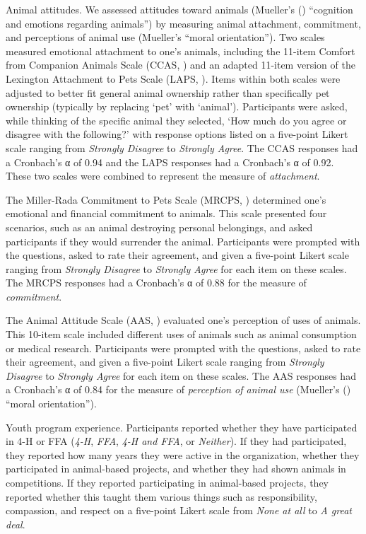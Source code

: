 \documentclass[
  jou,
  longtable,
  nolmodern,
  notxfonts,
  notimes,
  colorlinks=true,linkcolor=blue,citecolor=blue,urlcolor=blue]{apa7}
\begin{document}
{Animal attitudes.} We assessed attitudes toward animals (Mueller's
() ``cognition and emotions regarding
animals'') by measuring animal attachment, commitment, and perceptions
of animal use (Mueller's ``moral orientation''). Two scales measured
emotional attachment to one's animals, including the 11-item Comfort
from Companion Animals Scale (CCAS, ) and an adapted 11-item version of the Lexington Attachment to
Pets Scale (LAPS, ). Items within both scales were adjusted to better fit general
animal ownership rather than specifically pet ownership (typically by
replacing `pet' with `animal'). Participants were asked, while thinking
of the specific animal they selected, `How much do you agree or disagree
with the following?' with response options listed on a five-point Likert
scale ranging from \emph{Strongly Disagree} to \emph{Strongly Agree}.
The CCAS responses had a Cronbach's α of 0.94 and the LAPS responses had
a Cronbach's α of 0.92. These two scales were combined to represent the
measure of \emph{attachment}.

The Miller-Rada Commitment to Pets Scale (MRCPS,
) determined one's
emotional and financial commitment to animals. This scale presented four
scenarios, such as an animal destroying personal belongings, and asked
participants if they would surrender the animal. Participants were
prompted with the questions, asked to rate their agreement, and given a
five-point Likert scale ranging from \emph{Strongly Disagree} to
\emph{Strongly Agree} for each item on these scales. The MRCPS responses
had a Cronbach's α of 0.88 for the measure of \emph{commitment}.

The Animal Attitude Scale (AAS, ) evaluated one's perception of uses of animals. This
10-item scale included different uses of animals such as animal
consumption or medical research. Participants were prompted with the
questions, asked to rate their agreement, and given a five-point Likert
scale ranging from \emph{Strongly Disagree} to \emph{Strongly Agree} for
each item on these scales. The AAS responses had a Cronbach's α of 0.84
for the measure of \emph{perception of animal use} (Mueller's
() ``moral orientation'').

{Youth program experience.} Participants reported whether they have
participated in 4-H or FFA (\emph{4-H}, \emph{FFA}, \emph{4-H and FFA},
or \emph{Neither}). If they had participated, they reported how many
years they were active in the organization, whether they participated in
animal-based projects, and whether they had shown animals in
competitions. If they reported participating in animal-based projects,
they reported whether this taught them various things such as
responsibility, compassion, and respect on a five-point Likert scale
from \emph{None at all} to \emph{A great deal}.
\end{document}
